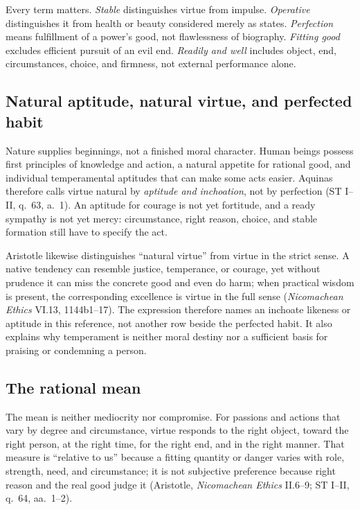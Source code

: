 Every term matters. \emph{Stable} distinguishes virtue from impulse. \emph{Operative} distinguishes it from health or beauty considered merely as states. \emph{Perfection} means fulfillment of a power's good, not flawlessness of biography. \emph{Fitting good} excludes efficient pursuit of an evil end. \emph{Readily and well} includes object, end, circumstances, choice, and firmness, not external performance alone.

\subsection{Natural aptitude, natural virtue, and perfected habit}

Nature supplies beginnings, not a finished moral character. Human beings possess first principles of knowledge and action, a natural appetite for rational good, and individual temperamental aptitudes that can make some acts easier. Aquinas therefore calls virtue natural by \emph{aptitude and inchoation}, not by perfection (ST I--II, q.~63, a.~1). An aptitude for courage is not yet fortitude, and a ready sympathy is not yet mercy: circumstance, right reason, choice, and stable formation still have to specify the act.

Aristotle likewise distinguishes ``natural virtue'' from virtue in the strict sense. A native tendency can resemble justice, temperance, or courage, yet without prudence it can miss the concrete good and even do harm; when practical wisdom is present, the corresponding excellence is virtue in the full sense (\emph{Nicomachean Ethics} VI.13, 1144b1--17). The expression therefore names an inchoate likeness or aptitude in this reference, not another row beside the perfected habit. It also explains why temperament is neither moral destiny nor a sufficient basis for praising or condemning a person.

\subsection{The rational mean}

The mean is neither mediocrity nor compromise. For passions and actions that vary by degree and circumstance, virtue responds to the right object, toward the right person, at the right time, for the right end, and in the right manner. That measure is ``relative to us'' because a fitting quantity or danger varies with role, strength, need, and circumstance; it is not subjective preference because right reason and the real good judge it (Aristotle, \emph{Nicomachean Ethics} II.6--9; ST I--II, q.~64, aa.~1--2).

